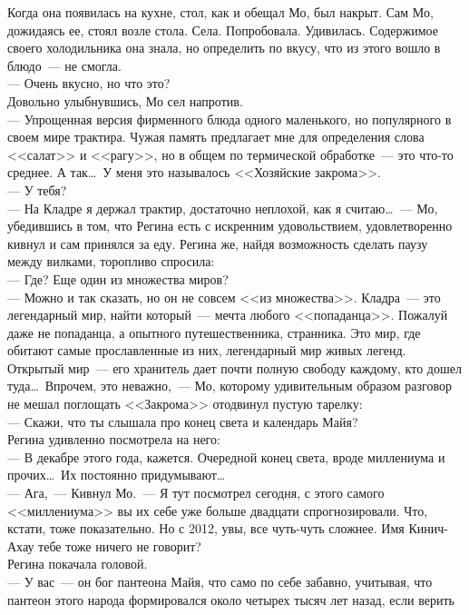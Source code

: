 Когда она появилась на кухне, стол, как и обещал Мо, был накрыт. Сам Мо, 
дожидаясь ее, стоял возле стола. Села. Попробовала. Удивилась. Содержимое 
своего 
холодильника она знала, но определить по вкусу, что из этого вошло в блюдо~--- 
не 
смогла.\\
--- Очень вкусно, но что это?\\
Довольно улыбнувшись, Мо сел напротив.\\
--- Упрощенная версия фирменного блюда одного маленького, но популярного в 
своем мире трактира. Чужая память предлагает мне для определения слова 
<<салат>> и <<рагу>>, но в общем по термической обработке~--- это что-то 
среднее. А так\ldots\ У меня это называлось <<Хозяйские закрома>>.\\
--- У тебя?\\
--- На Кладре я держал трактир, достаточно неплохой, как я считаю\ldots~--- 
Мо, убедившись в том, что Регина есть с искренним удовольствием, удовлетворенно 
кивнул и сам принялся за еду. Регина же, найдя возможность сделать паузу между 
вилками, торопливо спросила:\\
--- Где? Еще один из множества миров?\\
--- Можно и так сказать, но он не совсем <<из множества>>. Кладра~--- это 
легендарный 
мир, найти который~--- мечта любого <<попаданца>>. Пожалуй даже не попаданца, а 
опытного путешественника, странника. Это мир, где обитают самые прославленные 
из 
них, легендарный мир живых легенд. Открытый мир~--- его хранитель дает почти 
полную свободу каждому, кто дошел туда\ldots\ Впрочем, это неважно,~--- Мо, 
которому удивительным образом разговор не мешал поглощать <<Закрома>> отодвинул 
пустую тарелку:\\
--- Скажи, что ты слышала про конец света и календарь Майя?\\
Регина удивленно посмотрела на него:\\
--- В декабре этого года, кажется. Очередной конец света, вроде миллениума и 
прочих\ldots\ Их постоянно придумывают\ldots\\
--- Ага,~--- Кивнул Мо.~--- Я тут посмотрел сегодня, с этого самого 
<<миллениума>> вы их 
себе уже больше двадцати спрогнозировали. Что, кстати, тоже показательно. Но с 
2012, увы, все чуть-чуть сложнее. Имя Кинич-Ахау тебе тоже ничего не говорит?\\
Регина покачала головой.\\
--- У вас~--- он бог пантеона Майя, что само по себе забавно, учитывая, что 
пантеон этого народа формировался около четырех тысяч лет назад, если верить 
